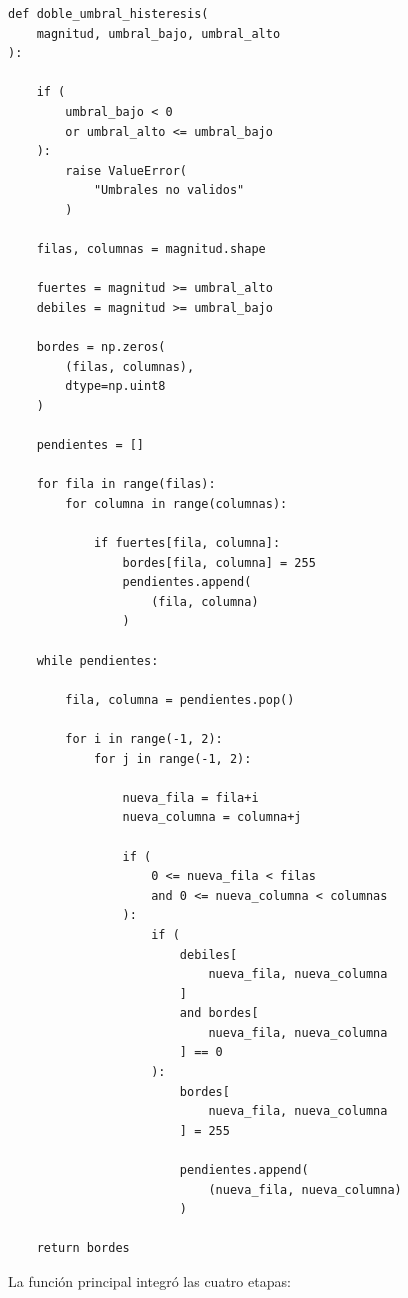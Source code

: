 \documentclass[11pt,letterpaper]{article}
\begin{document}
\begin{lstlisting}
def doble_umbral_histeresis(
    magnitud, umbral_bajo, umbral_alto
):

    if (
        umbral_bajo < 0
        or umbral_alto <= umbral_bajo
    ):
        raise ValueError(
            "Umbrales no validos"
        )

    filas, columnas = magnitud.shape

    fuertes = magnitud >= umbral_alto
    debiles = magnitud >= umbral_bajo

    bordes = np.zeros(
        (filas, columnas),
        dtype=np.uint8
    )

    pendientes = []

    for fila in range(filas):
        for columna in range(columnas):

            if fuertes[fila, columna]:
                bordes[fila, columna] = 255
                pendientes.append(
                    (fila, columna)
                )

    while pendientes:

        fila, columna = pendientes.pop()

        for i in range(-1, 2):
            for j in range(-1, 2):

                nueva_fila = fila+i
                nueva_columna = columna+j

                if (
                    0 <= nueva_fila < filas
                    and 0 <= nueva_columna < columnas
                ):
                    if (
                        debiles[
                            nueva_fila, nueva_columna
                        ]
                        and bordes[
                            nueva_fila, nueva_columna
                        ] == 0
                    ):
                        bordes[
                            nueva_fila, nueva_columna
                        ] = 255

                        pendientes.append(
                            (nueva_fila, nueva_columna)
                        )

    return bordes
\end{lstlisting}

La función principal integró
las cuatro etapas:
\end{document}
